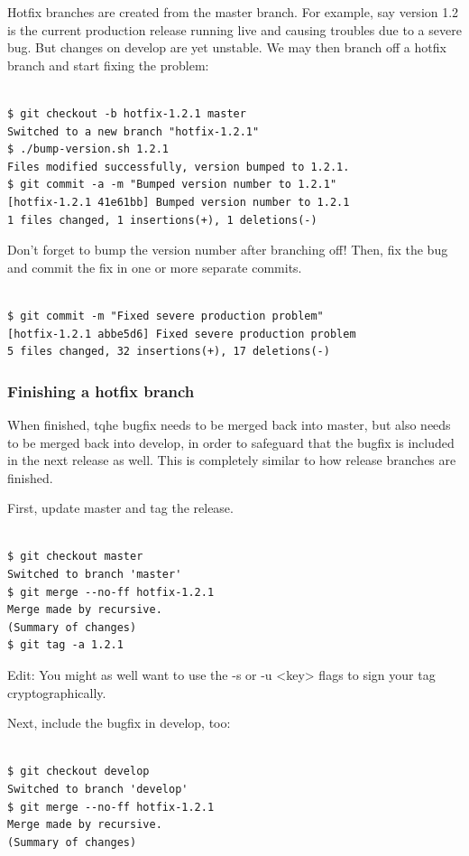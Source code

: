 Hotfix branches are created from the master branch. For example, say version 1.2
is the current production release running live and causing troubles due to a
severe bug. But changes on develop are yet unstable. We may then branch off a
hotfix branch and start fixing the problem:\\\\
\begin{verbatim}
$ git checkout -b hotfix-1.2.1 master
Switched to a new branch "hotfix-1.2.1"
$ ./bump-version.sh 1.2.1
Files modified successfully, version bumped to 1.2.1.
$ git commit -a -m "Bumped version number to 1.2.1"
[hotfix-1.2.1 41e61bb] Bumped version number to 1.2.1
1 files changed, 1 insertions(+), 1 deletions(-)
\end{verbatim}
Don’t forget to bump the version number after branching off!
Then, fix the bug and commit the fix in one or more separate commits.\\\\
\begin{verbatim}
$ git commit -m "Fixed severe production problem"
[hotfix-1.2.1 abbe5d6] Fixed severe production problem
5 files changed, 32 insertions(+), 17 deletions(-)
\end{verbatim}

\subsubsection{Finishing a hotfix branch}

When finished, tqhe bugfix needs to be merged back into master, but also needs to
be merged back into develop, in order to safeguard that the bugfix is included in
the next release as well. This is completely similar to how release branches are
finished.

First, update master and tag the release.
\\\\
\begin{verbatim}
$ git checkout master
Switched to branch 'master'
$ git merge --no-ff hotfix-1.2.1
Merge made by recursive.
(Summary of changes)
$ git tag -a 1.2.1
\end{verbatim}

Edit: You might as well want to use the -s or -u <key> flags to sign your tag
cryptographically.

Next, include the bugfix in develop, too:\\\\
\begin{verbatim}
$ git checkout develop
Switched to branch 'develop'
$ git merge --no-ff hotfix-1.2.1
Merge made by recursive.
(Summary of changes)
\end{verbatim}


